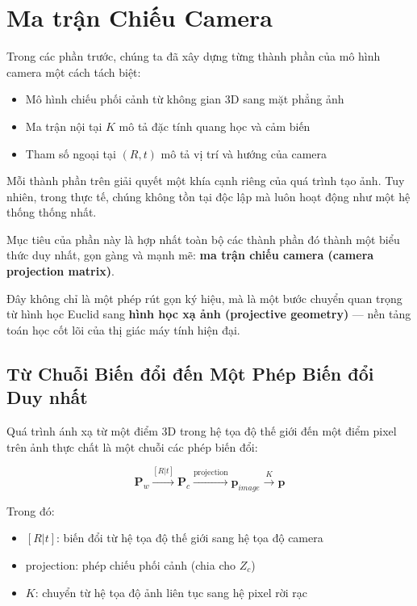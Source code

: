 \section{Ma trận Chiếu Camera}
\label{sec:camera_projection_matrix}

Trong các phần trước, chúng ta đã xây dựng từng thành phần của mô hình camera một cách tách biệt:
\begin{itemize}
	\item Mô hình chiếu phối cảnh từ không gian 3D sang mặt phẳng ảnh
	\item Ma trận nội tại $K$ mô tả đặc tính quang học và cảm biến
	\item Tham số ngoại tại $(R, t)$ mô tả vị trí và hướng của camera
\end{itemize}

Mỗi thành phần trên giải quyết một khía cạnh riêng của quá trình tạo ảnh. Tuy nhiên, trong thực tế, chúng không tồn tại độc lập mà luôn hoạt động như một hệ thống thống nhất.

Mục tiêu của phần này là hợp nhất toàn bộ các thành phần đó thành một biểu thức duy nhất, gọn gàng và mạnh mẽ: \textbf{ma trận chiếu camera (camera projection matrix)}.

Đây không chỉ là một phép rút gọn ký hiệu, mà là một bước chuyển quan trọng từ hình học Euclid sang \textbf{hình học xạ ảnh (projective geometry)} — nền tảng toán học cốt lõi của thị giác máy tính hiện đại.

\subsection{Từ Chuỗi Biến đổi đến Một Phép Biến đổi Duy nhất}
\label{subsec:projection_pipeline}

Quá trình ánh xạ từ một điểm 3D trong hệ tọa độ thế giới đến một điểm pixel trên ảnh thực chất là một chuỗi các phép biến đổi:

\[
\mathbf{P}_w \xrightarrow{[R|t]} \mathbf{P}_c \xrightarrow{\text{projection}} \mathbf{p}_{image} \xrightarrow{K} \mathbf{p}
\]

Trong đó:
\begin{itemize}
	\item $[R|t]$: biến đổi từ hệ tọa độ thế giới sang hệ tọa độ camera
	\item projection: phép chiếu phối cảnh (chia cho $Z_c$)
	\item $K$: chuyển từ hệ tọa độ ảnh liên tục sang hệ pixel rời rạc
\end{itemize}

